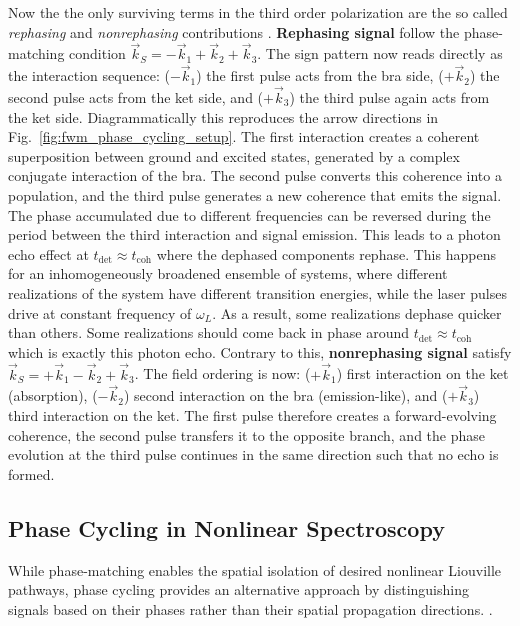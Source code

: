Now the the only surviving terms in the third order polarization are the so called \textit{rephasing} and \textit{nonrephasing} contributions \cite{cho2009twodimensionalopticalspectroscopy, jonas2003twodimensionalfemtosecondspectroscopy}.
\textbf{Rephasing signal} follow the phase-matching condition $\vec{k}_S = -\vec{k}_1 + \vec{k}_2 + \vec{k}_3$. The sign pattern now reads directly as the interaction sequence: ($-\vec{k}_1$) the first pulse acts from the bra side, ($+\vec{k}_2$) the second pulse acts from the ket side, and ($+\vec{k}_3$) the third pulse again acts from the ket side. Diagrammatically this reproduces the arrow directions in Fig.~\ref{fig:fwm_phase_cycling_setup}. The first interaction creates a coherent superposition between ground and excited states, generated by a complex conjugate interaction of the bra. The second pulse converts this coherence into a population, and the third pulse generates a new coherence that emits the signal. The phase accumulated due to different frequencies can be reversed during the period between the third interaction and signal emission. This leads to a photon echo effect at $t_{\text{det}} \approx t_{\text{coh}}$ where the dephased components rephase.
This happens for an inhomogeneously broadened ensemble of systems, where different realizations of the system have different transition energies, while the laser pulses drive at constant frequency of $\omega_L$. As a result, some realizations dephase quicker than others. Some realizations should come back in phase around $t_{\text{det}} \approx t_{\text{coh}}$ which is exactly this photon echo.
Contrary to this, \textbf{nonrephasing signal} satisfy $\vec{k}_S = +\vec{k}_1 - \vec{k}_2 + \vec{k}_3$. The field ordering is now: ($+\vec{k}_1$) first interaction on the ket (absorption), ($-\vec{k}_2$) second interaction on the bra (emission-like), and ($+\vec{k}_3$) third interaction on the ket. The first pulse therefore creates a forward-evolving coherence, the second pulse transfers it to the opposite branch, and the phase evolution at the third pulse continues in the same direction such that no echo is formed.


\subsection{Phase Cycling in Nonlinear Spectroscopy}
\label{subsec:phase_cycling}

\noindent 
While phase-matching enables the spatial isolation of desired nonlinear Liouville pathways, phase cycling provides an alternative approach by distinguishing signals based on their phases rather than their spatial propagation directions. %
\cite{mukamel1995principlesnonlinearoptical, cho2009twodimensionalopticalspectroscopy, jonas2003twodimensionalfemtosecondspectroscopy, brixneretal2004phasestabilizedtwodimensionalelectronic, greenetal2024vibrationalcoherenceshalfbroadband}.

